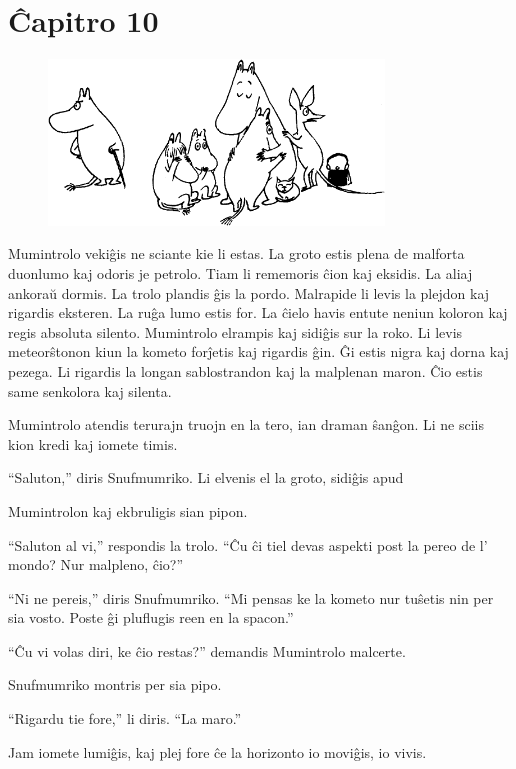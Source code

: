 \chapter*[Ĉapitro 10]{Ĉapitro 10}


\begin{figure}[htbp]
\centering
\includegraphics[width=253pt,height=125pt]{10-1.png}
\caption{}
\label{10-1}
\end{figure}

\noindent  Mumintrolo vekiĝis ne sciante kie li estas. La groto estis plena de malforta duonlumo kaj odoris je petrolo. Tiam li rememoris ĉion kaj eksidis. La aliaj ankoraŭ dormis. La trolo plandis ĝis la pordo. Malrapide li levis la plejdon kaj rigardis eksteren. La ruĝa lumo estis for. La ĉielo havis entute neniun koloron kaj regis absoluta silento. Mumintrolo elrampis kaj sidiĝis sur la roko. Li levis meteorŝtonon kiun la kometo forĵetis kaj rigardis ĝin. Ĝi estis nigra kaj dorna kaj pezega. Li rigardis la longan sablostrandon kaj la malplenan maron. Ĉio estis same senkolora kaj silenta.

Mumintrolo atendis terurajn truojn en la tero, ian draman ŝanĝon. Li ne sciis kion kredi kaj iomete timis.

``Saluton,'' diris Snufmumriko. Li elvenis el la groto, sidiĝis apud

Mumintrolon kaj ekbruligis sian pipon.

``Saluton al vi,'' respondis la trolo. ``Ĉu ĉi tiel devas aspekti post la pereo de l' mondo? Nur malpleno, ĉio?''

``Ni ne pereis,'' diris Snufmumriko. ``Mi pensas ke la kometo nur tuŝetis nin per sia vosto. Poste ĝi pluflugis reen en la spacon.''

``Ĉu vi volas diri, ke ĉio restas?'' demandis Mumintrolo malcerte.

Snufmumriko montris per sia pipo.

``Rigardu tie fore,'' li diris. ``La maro.''

Jam iomete lumiĝis, kaj plej fore ĉe la horizonto io moviĝis, io vivis.

